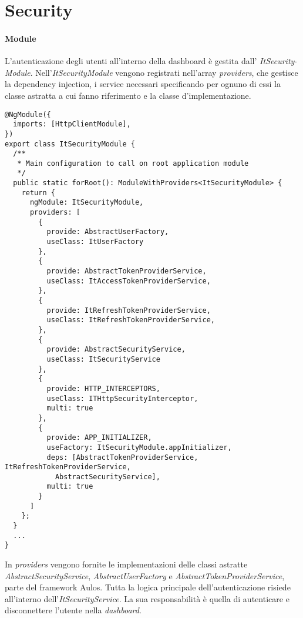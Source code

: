\section{Security}
\label{chap:security}

\paragraph{Module}
L'autenticazione degli utenti all'interno della dashboard è gestita dall' \textit{ItSecurity}-\textit{Module}. Nell'\textit{ItSecurityModule} vengono registrati nell'array \textit{providers}, che gestisce la dependency injection, i service necessari specificando per ognuno di essi la classe astratta a cui fanno riferimento e la classe d'implementazione.
\begin{lstlisting}[caption={Injection dei service nell'ItSecurityModule}, style=javaScriptCode]
@NgModule({
  imports: [HttpClientModule],
})
export class ItSecurityModule {
  /**
   * Main configuration to call on root application module
   */
  public static forRoot(): ModuleWithProviders<ItSecurityModule> {
    return {
      ngModule: ItSecurityModule,
      providers: [
        {
          provide: AbstractUserFactory,
          useClass: ItUserFactory
        },
        {
          provide: AbstractTokenProviderService,
          useClass: ItAccessTokenProviderService,
        },
        {
          provide: ItRefreshTokenProviderService,
          useClass: ItRefreshTokenProviderService,
        },
        {
          provide: AbstractSecurityService,
          useClass: ItSecurityService
        },
        {
          provide: HTTP_INTERCEPTORS,
          useClass: ITHttpSecurityInterceptor,
          multi: true
        },
        {
          provide: APP_INITIALIZER,
          useFactory: ItSecurityModule.appInitializer,
          deps: [AbstractTokenProviderService, ItRefreshTokenProviderService, 
            AbstractSecurityService],
          multi: true
        }
      ]
    };
  }
  ...
}
\end{lstlisting}
In \textit{providers} vengono fornite le implementazioni delle classi astratte
\textit{AbstractSecurityService}, \textit{AbstractUserFactory} e \textit{AbstractTokenProviderService}, parte del framework Aulos.
Tutta la logica principale dell'autenticazione risiede all'interno dell'\textit{ItSecurityService}. La sua responsabilità è quella di autenticare e disconnettere l'utente nella \textit{dashboard}. \\
